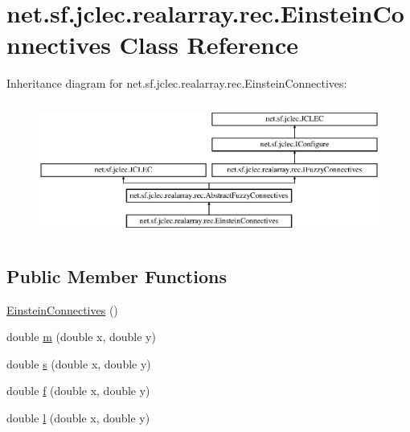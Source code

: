 \hypertarget{classnet_1_1sf_1_1jclec_1_1realarray_1_1rec_1_1_einstein_connectives}{\section{net.\-sf.\-jclec.\-realarray.\-rec.\-Einstein\-Connectives Class Reference}
\label{classnet_1_1sf_1_1jclec_1_1realarray_1_1rec_1_1_einstein_connectives}
}
Inheritance diagram for net.\-sf.\-jclec.\-realarray.\-rec.\-Einstein\-Connectives\-:\begin{figure}[H]
\begin{center}
\leavevmode
\includegraphics[height=4.416404cm]{classnet_1_1sf_1_1jclec_1_1realarray_1_1rec_1_1_einstein_connectives}
\end{center}
\end{figure}
\subsection*{Public Member Functions}
\begin{DoxyCompactItemize}
\item 
\hyperlink{classnet_1_1sf_1_1jclec_1_1realarray_1_1rec_1_1_einstein_connectives_a1cc72a5e21d70217dfd213eb9becc472}{Einstein\-Connectives} ()
\item 
double \hyperlink{classnet_1_1sf_1_1jclec_1_1realarray_1_1rec_1_1_einstein_connectives_a71258e1bc95be9f76c53eefb9e8b8d4b}{m} (double x, double y)
\item 
double \hyperlink{classnet_1_1sf_1_1jclec_1_1realarray_1_1rec_1_1_einstein_connectives_a478c20dfb3b17bc599ef1727dd55f8a0}{s} (double x, double y)
\item 
double \hyperlink{classnet_1_1sf_1_1jclec_1_1realarray_1_1rec_1_1_einstein_connectives_a00d986f392e8638f29ad3718dd67e0cc}{f} (double x, double y)
\item 
double \hyperlink{classnet_1_1sf_1_1jclec_1_1realarray_1_1rec_1_1_einstein_connectives_a9e0659d2327ad274e093181a133ad9ba}{l} (double x, double y)
\end{DoxyCompactItemize}


